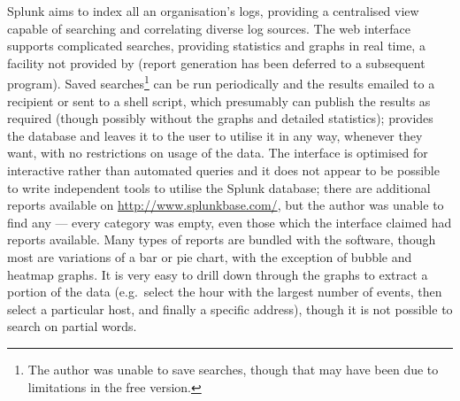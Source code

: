 Splunk aims to index all an organisation's logs, providing a centralised
view capable of searching and correlating diverse log sources.  The web
interface supports complicated searches, providing statistics and graphs in
real time, a facility not provided by \parsername{} (report generation has
been deferred to a subsequent program).  Saved searches\footnote{The author
was unable to save searches, though that may have been due to limitations
in the free version.} can be run periodically and the results emailed to a
recipient or sent to a shell script, which presumably can publish the
results as required (though possibly without the graphs and detailed
statistics); \parsername{} provides the database and leaves it to the user
to utilise it in any way, whenever they want, with no restrictions on usage
of the data.  The interface is optimised for interactive rather than
automated queries and it does not appear to be possible to write
independent tools to utilise the Splunk database; there are additional
reports available on \url{http://www.splunkbase.com/}, but the author was
unable to find any --- every category was empty, even those which the
interface claimed had reports available.  Many types of reports are bundled
with the software, though most are variations of a bar or pie chart, with
the exception of bubble and heatmap graphs.  It is very easy to drill down
through the graphs to extract a portion of the data (e.g.\ select the hour
with the largest number of events, then select a particular host, and
finally a specific address), though it is not possible to search on partial
words.


